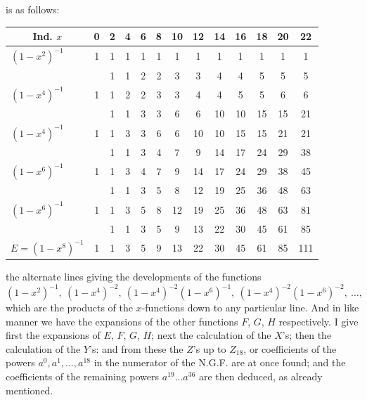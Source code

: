 \documentclass[11pt]{article}
\begin{document}
\noindent is as follows:
\begin{center}\small
\begin{tabular}{l|cccccccccccc}
\multicolumn{1}{c}{\textbf{Ind. $x$}} & 0 & 2 & 4 & 6 & 8 & 10 & 12 & 14 & 16 & 18 & 20 & 22 \\\hline
$(1 - x^{2})^{-1}$         & 1 & 1 & 1 & 1 & 1 & 1 & 1 & 1 & 1 & 1 & 1 & 1\\
                           &   & 1 & 1 & 2 & 2 & 3 & 3 & 4 & 4 & 5 & 5 & 5\\
$(1 - x^{4})^{-1}$         & 1 & 1 & 2 & 2 & 3 & 3 & 4 & 4 & 5 & 5 & 6 & 6\\
                           &   & 1 & 1 & 3 & 3 & 6 & 6 & 10 & 10 & 15 & 15 & 21\\
$(1 - x^{4})^{-1}$         & 1 & 1 & 3 & 3 & 6 & 6 & 10 & 10 & 15 & 15 & 21 & 21\\
                           &   & 1 & 1 & 3 & 4 & 7 & 9 & 14 & 17 & 24 & 29 & 38\\
$(1 - x^{6})^{-1}$         & 1 & 1 & 3 & 4 & 7 & 9 & 14 & 17 & 24 & 29 & 38 & 45\\
                           &   & 1 & 1 & 3 & 5 & 8 & 12 & 19 & 25 & 36 & 48 & 63\\
$(1 - x^{6})^{-1}$         & 1 & 1 & 3 & 5 & 8 & 12 & 19 & 25 & 36 & 48 & 63 & 81\\
                           &   & 1 & 1 & 3 & 5 & 9 & 13 & 22 & 30 & 45 & 61 & 85\\
$E = (1 - x^{8})^{-1}$     & 1 & 1 & 3 & 5 & 9 & 13 & 22 & 30 & 45 & 61 & 85 & 111\\
\end{tabular}
\end{center}

the alternate lines giving the developments of the functions
\[ (1 - x^{2})^{-1},\ (1 - x^{4})^{-2},\ (1 - x^{4})^{-2}(1 - x^{6})^{-1},\ (1 - x^{4})^{-2}(1 - x^{6})^{-2},\ \dots, \]
which are the products of the $x$-functions down to any particular line. And in like manner we have the expansions of the other functions $F$, $G$, $H$ respectively. I give first the expansions of $E$, $F$, $G$, $H$; next the calculation of the $X$'s; then the calculation of the $Y$'s: and from these the $Z$'s up to $Z_{18}$, or coefficients of the powers $a^{0}, a^{1}, \dots, a^{18}$ in the numerator of the N.G.F. are at once found; and the coefficients of the remaining powers $a^{19} \dots a^{36}$ are then deduced, as already mentioned.
\end{document}
